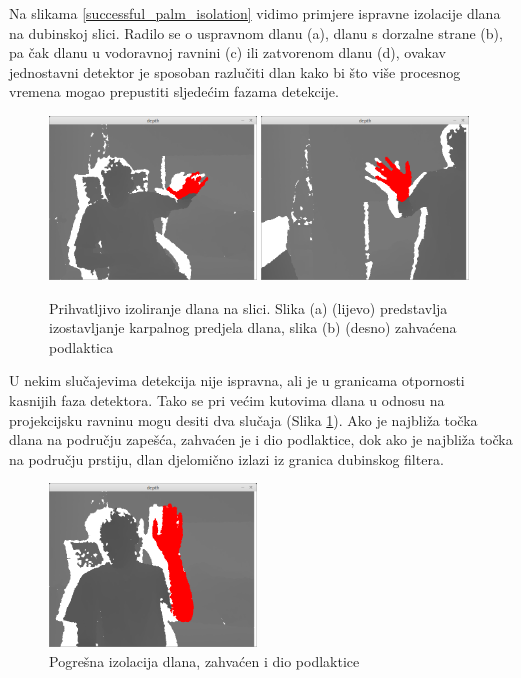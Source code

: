\documentclass[times, utf8, diplomski, numeric]{fer}
\begin{document}
Na slikama \ref{successful_palm_isolation} vidimo primjere ispravne izolacije dlana na dubinskoj slici. Radilo se o uspravnom dlanu (a), dlanu s dorzalne strane (b), pa čak dlanu u vodoravnoj ravnini (c) ili zatvorenom dlanu (d), ovakav jednostavni detektor je sposoban razlučiti dlan kako bi što više procesnog vremena mogao prepustiti sljedećim fazama detekcije.
\begin{figure}[h!]
\centering
\includegraphics[width = 0.49\textwidth]{detekcija/izolacija-zadovoljavajuce-1}
\includegraphics[width = 0.49\textwidth]{detekcija/izolacija-zadovoljavajuce-2}
\caption{Prihvatljivo izoliranje dlana na slici. 
Slika (a) (lijevo) predstavlja izostavljanje karpalnog predjela dlana, 
slika (b) (desno) zahvaćena podlaktica} \label{satisfactorily_palm_isolation}
\end{figure}

U nekim slučajevima detekcija nije ispravna, ali je u granicama otpornosti kasnijih faza detektora. Tako se pri većim kutovima dlana u odnosu na projekcijsku ravninu mogu desiti dva slučaja (Slika \ref{satisfactorily_palm_isolation}). Ako je najbliža točka dlana na području zapešća, zahvaćen je i dio podlaktice, dok ako je najbliža točka na području prstiju, dlan djelomično izlazi iz granica dubinskog filtera.

\begin{figure}[h!]
\centering
\includegraphics[width = 0.49\textwidth]{detekcija/izolacija-krivo-1}
\caption{Pogrešna izolacija dlana, zahvaćen i dio podlaktice} \label{poor_palm_isolation}
\end{figure}
\end{document}
